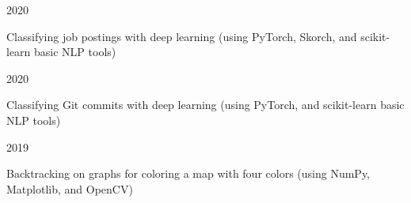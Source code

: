 

\begin{cvprojects}

  \cvproject
    {} %
    {} %
    {} %
    {2020} %
    {
      \begin{cvitems} %
        \item {Classifying job postings with deep learning (using PyTorch, Skorch, and scikit-learn basic NLP tools)}
      \end{cvitems}
    }

  \cvproject
    {} %
    {} %
    {} %
    {2020} %
    {
      \begin{cvitems} %
        \item {Classifying Git commits with deep learning (using PyTorch, and scikit-learn basic NLP tools)}
      \end{cvitems}
    }


  \cvproject
    {} %
    {} %
    {} %
    {2019} %
    {
      \begin{cvitems} %
        \item {Backtracking on graphs for coloring a map with four colors (using NumPy, Matplotlib, and OpenCV)}
      \end{cvitems}
    }




\end{cvprojects}
